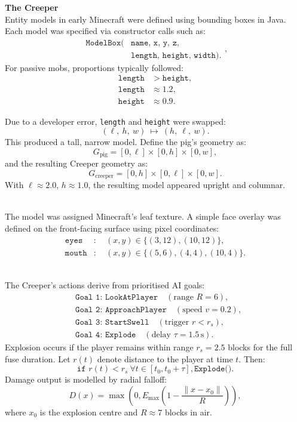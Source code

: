 \begin{technical}
{\Large\textbf{The Creeper}}\\[0.1em]

Entity models in early Minecraft were defined using bounding boxes in Java. 
Each model was specified via constructor calls such as:
\[
\begin{aligned}
\texttt{ModelBox(}&\texttt{name, x, y, z,} \\
&\texttt{length, height, width)}.
\end{aligned},
\]
For passive mobs, proportions typically followed:
\begin{align*}
\texttt{length} &> \texttt{height}, \\
\texttt{length} &\approx 1.2, \\
\texttt{height} &\approx 0.9.
\end{align*}

Due to a developer error, \texttt{length} and \texttt{height} were swapped:
\[
(\ell,\ h,\ w)\ \mapsto\ (h,\ \ell,\ w).
\]
This produced a tall, narrow model. Define the pig’s geometry as:
\[
G_{\text{pig}} = [0,\ell] \times [0,h] \times [0,w],
\]
and the resulting Creeper geometry as:
\[
G_{\text{creeper}} = [0,h] \times [0,\ell] \times [0,w].
\]
With \( \ell \approx 2.0 \), \( h \approx 1.0 \), the resulting model appeared upright and columnar.


\vspace{0.3em}
\\[0.5em]
The model was assigned Minecraft’s leaf texture. A simple face overlay was defined
on the front-facing surface using pixel coordinates:
\begin{align*}
\texttt{eyes} &:\quad (x,y) \in \{(3,12), (10,12)\}, \\
\texttt{mouth} &:\quad (x,y) \in \{(5,6), (4,4), (10,4)\}.
\end{align*}

\vspace{0.3em}
\\[0.5em]
The Creeper’s actions derive from prioritised AI goals:
\begin{align*}
&\texttt{Goal 1: LookAtPlayer} \quad (\text{range } R = 6), \\
&\texttt{Goal 2: ApproachPlayer} \quad (\text{speed } v = 0.2), \\
&\texttt{Goal 3: StartSwell} \quad (\text{trigger } r < r_s), \\
&\texttt{Goal 4: Explode} \quad (\text{delay } \tau = 1.5\,\text{s}).
\end{align*}
Explosion occurs if the player remains within range \( r_s = 2.5 \) blocks for the full
fuse duration. Let \( r(t) \) denote distance to the player at time \( t \). Then:
\[
\texttt{if } r(t) < r_s \ \forall t \in [t_0, t_0 + \tau], \texttt{Explode()}.
\]
Damage output is modelled by radial falloff:
\[
D(x) = \max\left(0, E_{\max}\left(1 - \frac{\|x - x_0\|}{R}\right)\right),
\]
where \( x_0 \) is the explosion centre and \( R \approx 7 \) blocks in air.


\end{technical}
